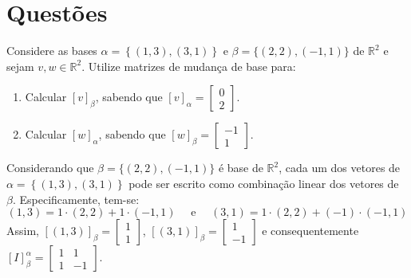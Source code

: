 \documentclass[12pt,a4paper]{article}
\newcommand*\R{\mathbb{R}}
\begin{document}
\section*{Questões}
\begin{ExerciseList}
\Exercise[title={2,0}] Considere as bases
$\alpha = \left\{ (1,3), (3,1)\right\}$
e
$\beta = \{ (2,2), (-1,1) \}$ de $\R^2$ e sejam $v, w \in \R^2$. Utilize matrizes de mudança de base para:
\begin{enumerate}
\item Calcular $[v]_{\beta}$, sabendo que
$[v]_{\alpha} =
\begin{bmatrix}
0\\2
\end{bmatrix}$.
\item Calcular $[w]_{\alpha}$, sabendo que
$[w]_{\beta} =
\begin{bmatrix}
-1\\1
\end{bmatrix}$.
\end{enumerate}
\Answer Considerando que $\beta = \{ (2,2), (-1,1) \}$ é base de $\R^2$, cada um dos vetores de $\alpha = \left\{ (1,3), (3,1)\right\}$ pode ser escrito como combinação linear dos vetores de $\beta$. Especificamente, tem-se:
\[
(1,3) = 1\cdot(2,2)+1\cdot(-1,1)\quad \text{ e }\quad
(3,1) = 1\cdot(2,2)+(-1)\cdot(-1,1)
\]
Assim,
$[ (1,3) ]_{\beta} =
\begin{bmatrix}
1 \\
1
\end{bmatrix}$,
$[ (3,1) ]_{\beta} =
\begin{bmatrix}
1 \\
-1
\end{bmatrix}$
e consequentemente
$[I]_{\beta}^{\alpha}
=
\begin{bmatrix}
1 & 1 \\
1 & -1
\end{bmatrix}$.


\end{ExerciseList}
\end{document}
